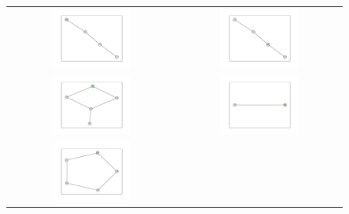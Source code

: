 \documentclass[12pt, a4paper]{extarticle}
\begin{document}
\begin{figure}\centering\begin{tabularx}{\textwidth}{cc}
\includegraphics[width=0.5\textwidth]{task11-graphlets/4_21-17-20-23.pdf} &
\includegraphics[width=0.5\textwidth]{task11-graphlets/4_21-20-23-24.pdf} \\
\includegraphics[width=0.5\textwidth]{task11-graphlets/5_10-16-18-25-23.pdf} &
\includegraphics[width=0.5\textwidth]{task11-graphlets/2_18-23.pdf} \\
\includegraphics[width=0.5\textwidth]{task11-graphlets/5_14-16-21-18-23.pdf} &

\end{tabularx}
\end{figure}
\end{document}
